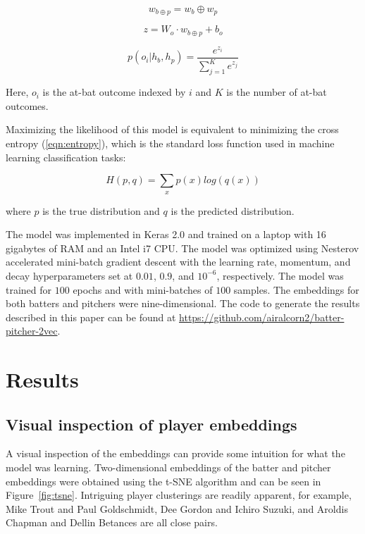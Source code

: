 \documentclass{article}
\begin{document}
\begin{equation}
\label{eqn:concat}
w_{b \oplus p} = w_b \oplus w_p
\end{equation}

\begin{equation}
\label{eqn:output}
z = W_o \cdot w_{b \oplus p} + b_o
\end{equation}

\begin{equation}
\label{eqn:prob}
p(o_i | h_b, h_p) = \frac{e^{z_i}}{\sum_{j=1}^{K} e^{z_j}}
\end{equation}

Here, $o_i$ is the at-bat outcome indexed by $i$ and $K$ is the number of at-bat outcomes.

Maximizing the likelihood of this model is equivalent to minimizing the cross entropy (\ref{eqn:entropy}), which is the standard loss function used in machine learning classification tasks:

\begin{equation}
\label{eqn:entropy}
H(p,q) = \sum_{x} p(x)log(q(x))
\end{equation}

where $p$ is the true distribution and $q$ is the predicted distribution.

The model was implemented in Keras 2.0 \parencite{Keras2015} and trained on a laptop with 16 gigabytes of RAM and an Intel i7 CPU. The model was optimized using Nesterov accelerated mini-batch gradient descent with the learning rate, momentum, and decay hyperparameters set at $0.01$, $0.9$, and $10^{-6}$, respectively. The model was trained for $100$ epochs and with mini-batches of $100$ samples. The embeddings for both batters and pitchers were nine-dimensional. The code to generate the results described in this paper can be found at \url{https://github.com/airalcorn2/batter-pitcher-2vec}.

\section{Results}
\label{results}

\subsection{Visual inspection of player embeddings}

A visual inspection of the embeddings can provide some intuition for what the model was learning. Two-dimensional embeddings of the batter and pitcher embeddings were obtained using the t-SNE algorithm \parencite{VanderMaaten2008} and can be seen in Figure~\ref{fig:tsne}. Intriguing player clusterings are readily apparent, for example, Mike Trout and Paul Goldschmidt, Dee Gordon and Ichiro Suzuki, and Aroldis Chapman and Dellin Betances are all close pairs.
\end{document}

